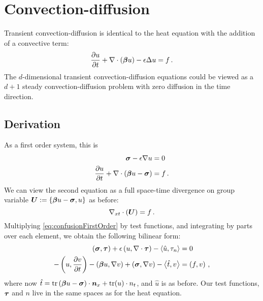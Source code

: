 \documentclass[Proposal.tex]{subfiles}
\begin{document}
\section{Convection-diffusion}
Transient convection-diffusion is identical to the heat equation with the addition of a convective term:
\begin{equation*}
\frac{\partial u}{\partial t}+\nabla\cdot(\boldsymbol\beta u)-\epsilon\Delta u=f\,.
\end{equation*}
The $d$-dimensional transient convection-diffusion equations could be viewed as a $d+1$ steady convection-diffusion problem with zero diffusion in the time direction.

\subsection{Derivation}
As a first order system, this is
\begin{equation}
\label{eq:confusionFirstOrder}
\begin{aligned}
\boldsymbol\sigma-\epsilon\nabla u&=0\\
\frac{\partial u}{\partial t}+\nabla\cdot\left( \boldsymbol\beta u-\boldsymbol\sigma \right)&=f\,.
\end{aligned}
\end{equation}
We can view the second equation as a full space-time divergence on group variable $\boldsymbol U:=\left\{ \boldsymbol\beta u-\boldsymbol\sigma,u \right\}$ as before:
\begin{equation}
	\nabla_{xt}\cdot\left( \boldsymbol U \right)=f\,.
\end{equation}
Multiplying \eqref{eq:confusionFirstOrder} by test functions, and integrating by parts over each element, we obtain the following bilinear form:
\begin{equation}
\label{eq:confusionBF}
	\begin{aligned}
		\left( \boldsymbol\sigma,\boldsymbol\tau \right)+\epsilon\left( u,\nabla\cdot\boldsymbol\tau \right)-\left\langle \hat u,\tau_n \right\rangle&=0\\
		-\left( u,\frac{\partial v}{\partial t} \right)-\left( \boldsymbol\beta u,\nabla v \right)+\left( \boldsymbol\sigma,\nabla v \right)-\left\langle \hat t,v \right\rangle&=\left( f,v \right)\,,
	\end{aligned}
\end{equation}
where now $\hat t=\operatorname*{tr}\left( \boldsymbol\beta u-\boldsymbol\sigma \right)\cdot\boldsymbol n_x+\operatorname*{tr}(u)\cdot n_t$, and $\hat u$ is as before. Our test functions, $\boldsymbol\tau$ and $n$ live in the same spaces as for the heat equation.
\end{document}

